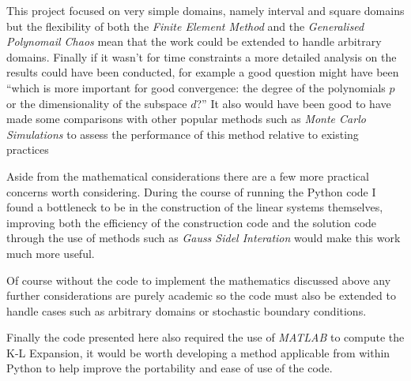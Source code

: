 This project focused on very simple domains, namely interval and square domains
but the flexibility of both the \textit{Finite Element Method} and the
\textit{Generalised Polynomail Chaos} mean that the work could be extended to
handle arbitrary domains. Finally if it wasn't for time constraints a more
detailed analysis on the results could have been conducted, for example a good
question might have been ``which is more important for good convergence: the
degree of the polynomials $p$ or the dimensionality of the subspace $d$?'' It
also would have been good to have made some comparisons with other popular
methods such as \textit{Monte Carlo Simulations} to assess the performance of
this method relative to existing practices

Aside from the mathematical considerations there are a few more practical
concerns worth considering. During the course of running the Python code I
found a bottleneck to be in the construction of the linear systems themselves,
improving both the efficiency of the construction code and the solution code
through the use of methods such as \textit{Gauss Sidel Interation} would make
this work much more useful.

Of course without the code to implement the mathematics discussed above any
further considerations are purely academic so the code must also be extended to
handle cases such as arbitrary domains or stochastic boundary conditions.

Finally the code presented here also required the use of \textit{MATLAB}
to compute the K-L Expansion, it would be worth developing a method applicable
from within Python to help improve the portability and ease of use of the code.
